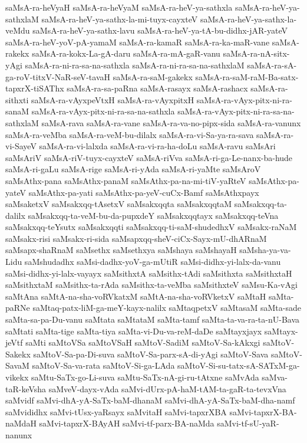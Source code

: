 {saMsA-ra-heVyaH
saMsA-ra-heVyaM
saMsA-ra-heV-ya-sathxla
saMsA-ra-heV-ya-sathxlaM
saMsA-ra-heV-ya-sathx-la-mi-tuyx-cayxteV
saMsA-ra-heV-ya-sathx-la-veMdu
saMsA-ra-heV-ya-sathx-lavu
saMsA-ra-heV-ya-tA-bu-didhx-jAR-yateV
saMsA-ra-heV-yoV-pA-yamaM
saMsA-ra-kamaR
saMsA-ra-ka-maR-vane
saMsA-rakekx
saMsA-ra-kokx-La-gA-daru
saMsA-ra-mA-gaR-vanu
saMsA-ra-nA-sitx-yAgi
saMsA-ra-ni-ra-sa-na-sathxla
saMsA-ra-ni-ra-sa-na-sathxlaM
saMsA-ra-sA-ga-roV-titxV-NaR-seV-tavaH
saMsA-ra-saM-gakekx
saMsA-ra-saM-raM-Ba-satx-tapxrX-tiSAThx
saMsA-ra-sa-paRna
saMsA-rasayx
saMsA-rashacx
saMsA-ra-sithxti
saMsA-ra-vAyxpeVtxH
saMsA-ra-vAyxpitxH
saMsA-ra-vAyx-pitx-ni-ra-sanaM
saMsA-ra-vAyx-pitx-ni-ra-sa-na-sathxla
saMsA-ra-vAyx-pitx-ni-ra-sa-na-sathxlaM
saMsA-rava
saMsA-ra-vane
saMsA-ra-va-no-pipx-sida
saMsA-ra-vanunx
saMsA-ra-veMba
saMsA-ra-veM-bu-dilalx
saMsA-ra-vi-Sa-ya-ra-sava
saMsA-ra-vi-SayeV
saMsA-ra-vi-lalxda
saMsA-ra-vi-ra-ha-doLu
saMsA-ravu
saMsAri
saMsAriV
saMsA-riV-tuyx-cayxteV
saMsA-riVva
saMsA-ri-ga-Le-nanx-ba-hude
saMsA-ri-gaLu
saMsA-rige
saMsA-ri-yAda
saMsA-ri-yaMte
saMsAroV
saMsAthx-pana
saMsAthx-panaM
saMsAthx-pa-na-mi-tiV-yaRteV
saMsAthx-pa-yateV
saMsAthx-pa-yati
saMsAthx-pa-yeV-cuCx-Bamf
saMsAthxpayx
saMsaketxV
saMsakxqq-tAsetxV
saMsakxqqta
saMsakxqqtaM
saMsakxqq-ta-dalilx
saMsakxqq-ta-veM-bu-da-pupxdeY
saMsakxqqtayx
saMsakxqq-teVna
saMsakxqq-teYsutx
saMsakxqqti
saMsakxqq-ti-saM-shudedhxV
saMsakx-raNaM
saMsakx-risi
saMsakx-ri-sida
saMsapxqq-sheV-ciCx-Sayx-mU-dhARnaM
saMsapx-shaRnaM
saMsethx
saMsethxya
saMshaya
saMshayaH
saMsha-ya-va-Lidu
saMshudadhx
saMsi-dadhx-yoV-ga-mUtiR
saMsi-didhx-yi-lalx-da-vanu
saMsi-didhx-yi-lalx-vayayx
saMsithxtA
saMsithx-tAdi
saMsithxta
saMsithxtaH
saMsithxtaM
saMsithx-ta-rAda
saMsithx-ta-veMba
saMsithxteV
saMsu-Ka-vAgi
saMtAna
saMtA-na-sha-voRVkatxM
saMtA-na-sha-voRVketxV
saMtaH
saMta-paRNe
saMtaq-patx-liM-ga-meY-kayx-nalilx
saMtaqpetxV
saMtasaM
saMta-sade
saMta-sa-pa-Du-vanu
saMtata
saMtataM
saMta-tamf
saMta-ta-va-ra-ta-nU-Bava
saMtati
saMta-tige
saMta-tiya
saMta-vi-Du-va-reM-daDe
saMtayxjayx
saMtayx-jeVtf
saMti
saMtoVSa
saMtoVSaH
saMtoV-SadiM
saMtoV-Sa-kAkxgi
saMtoV-Sakekx
saMtoV-Sa-pa-Di-suva
saMtoV-Sa-parx-sA-di-yAgi
saMtoV-Sava
saMtoV-SavaM
saMtoV-Sa-va-rata
saMtoV-Si-ga-LAda
saMtoV-Si-su-tatx-sA-SATxM-ga-vikekx
saMtu-SaTx-go-Li-suva
saMtu-SaTx-nA-gi-ru-tAtxne
saMvAda
saMva-taR-keVsha
saMveV-dayx-vAda
saMvi-dUrx-pA-haM-tAM-ta-gaR-ta-tevxVna
saMvidf
saMvi-dhA-yA-SaTx-baM-dhanaM
saMvi-dhA-yA-SaTx-baM-dha-namf
saMvididhx
saMvi-tUsx-yaRsayx
saMvitaH
saMvi-tapxrXBA
saMvi-tapxrX-BA-naMdaH
saMvi-tapxrX-BAyAH
saMvi-tf-parx-BA-naMda
saMvi-tf-sU-yaR-nanunx
}
